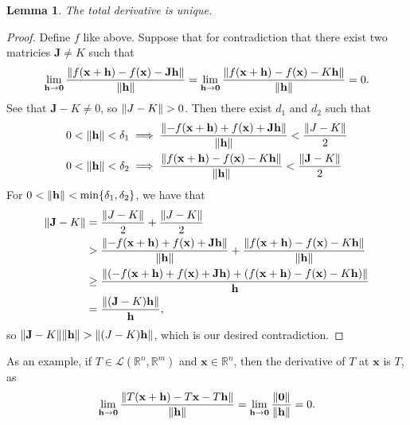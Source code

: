 \documentclass[11pt]{article}
\renewcommand{\vec}[1]{\mathbf{#1}}
\newcommand{\mat}[1]{\mathbf{#1}}
\newtheorem{lemma}{Lemma}
\begin{document}
\begin{adjustwidth}{0.5cm}{}
	\begin{lemma}
		The total derivative is unique.
	\end{lemma}
    \begin{proof}\renewcommand{\qedsymbol}{}
		Define $f$ like above. Suppose that for contradiction that there exist two matricies $\mat{J} \ne K$ such that
		\[
			\lim\limits_{\vec{h} \to \vec{0}} \frac{\norm{f(\vec{x} + \vec{h}) - f(\vec{x}) - \mat{J}\vec{h}}}{\norm{\vec{h}}}  = \lim\limits_{\vec{h} \to \vec{0}} \frac{\norm{f(\vec{x} + \vec{h}) - f(\vec{x}) - K\vec{h}}}{\norm{\vec{h}}} = 0.
		\]
		See that $\mat{J} - K \ne 0$, so $\norm{J - K} > 0$. Then there exist $d_{1}$ and $d_{2}$ such that
		\begin{align*}
			0 < \norm{\vec{h}} < \delta_{1} &\implies \frac{ \norm{-f(\vec{x} + \vec{h}) + f(\vec{x}) + \mat{J}\vec{h}}}{\norm{\vec{h}}} < \frac{\norm{J - K}}{2} \\
			0 < \norm{\vec{h}} < \delta_{2} &\implies \frac{\norm{f(\vec{x} + \vec{h}) - f(\vec{x}) - K\vec{h}}}{\norm{\vec{h}}} < \frac{\norm{\mat{J} - K}}{2} \\
		\end{align*}
		For $0 < \norm{\vec{h}} < \min \{ \delta_{1}, \delta_{2} \}$, we have that
		\begin{align*}	
			\norm{\mat{J} - K} &= \frac{\norm{J - K}}{2} + \frac{\norm{J - K}}{2} \\
			&> \frac{ \norm{-f(\vec{x} + \vec{h}) + f(\vec{x}) + \mat{J}\vec{h}}}{\norm{\vec{h}}} +\frac{\norm{f(\vec{x} + \vec{h}) - f(\vec{x}) - K\vec{h}}}{\norm{\vec{h}}} \\
			&\ge \frac{\norm{(-f(\vec{x} + \vec{h}) + f(\vec{x}) + \mat{J} \vec{h}) + (f(\vec{x} + \vec{h}) - f(\vec{x}) - K \vec{h})}}{\vec{h}} \\
			&= \frac{\norm{(\mat{J} - K) \vec{h}}}{\vec{h}},
		\end{align*}
		so $\norm{\mat{J} - K} \norm{\vec{h}} > \norm{(J - K) \vec{h}}$, which is our desired contradiction.
	\end{proof}
\end{adjustwidth}

As an example, if $T \in \mathcal{L}(\mathbb{R}^{n}, \mathbb{R}^{m})$ and $\vec{x} \in \mathbb{R}^{n}$, then the derivative of $T$ at $\vec{x}$ is $T$, as
\[
	\lim\limits_{\vec{h} \to \vec{0}} \frac{\norm{T(\vec{x} + \vec{h}) - T \vec{x} - T \vec{h}}}{\norm{\vec{h}}} = \lim\limits_{\vec{h} \to \vec{0}} \frac{\norm{\vec{0}}}{\norm{\vec{h}}} = 0.
\]
\end{document}
